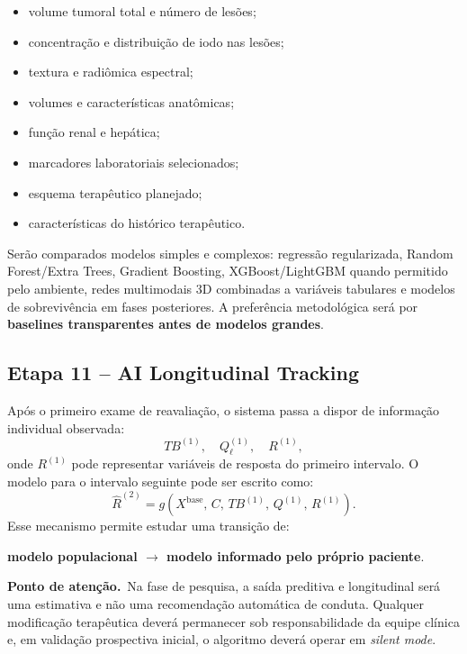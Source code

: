 \documentclass[11pt,a4paper]{article}
\newcommand{\atencao}{\textcolor{titleblue}{\textbf{Ponto de atenção.}}\ }
\begin{document}
\begin{itemize}
\item volume tumoral total e número de lesões;
\item concentração e distribuição de iodo nas lesões;
\item textura e radiômica espectral;
\item volumes e características anatômicas;
\item função renal e hepática;
\item marcadores laboratoriais selecionados;
\item esquema terapêutico planejado;
\item características do histórico terapêutico.
\end{itemize}

Serão comparados modelos simples e complexos: regressão regularizada, Random Forest/Extra Trees, Gradient Boosting, XGBoost/LightGBM quando permitido pelo ambiente, redes multimodais 3D combinadas a variáveis tabulares e modelos de sobrevivência em fases posteriores. A preferência metodológica será por \textbf{baselines transparentes antes de modelos grandes}.

\subsection{Etapa 11 -- AI Longitudinal Tracking}

Após o primeiro exame de reavaliação, o sistema passa a dispor de informação individual observada:
\begin{equation}
TB^{(1)},\quad Q_{\ell}^{(1)},\quad R^{(1)},
\end{equation}
onde $R^{(1)}$ pode representar variáveis de resposta do primeiro intervalo. O modelo para o intervalo seguinte pode ser escrito como:
\begin{equation}
\widehat{R}^{(2)} = g\left( X^{\text{base}},\, C,\, TB^{(1)},\, Q^{(1)},\, R^{(1)} \right).
\end{equation}
Esse mecanismo permite estudar uma transição de:
\begin{center}
\textbf{modelo populacional $\longrightarrow$ modelo informado pelo próprio paciente}.
\end{center}

\begin{caixa}
\atencao Na fase de pesquisa, a saída preditiva e longitudinal será uma estimativa e não uma recomendação automática de conduta. Qualquer modificação terapêutica deverá permanecer sob responsabilidade da equipe clínica e, em validação prospectiva inicial, o algoritmo deverá operar em \emph{silent mode}.
\end{caixa}
\end{document}
